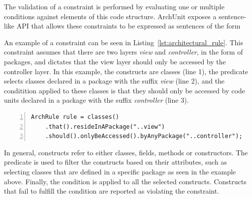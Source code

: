 The validation of a constraint is performed by evaluating one or multiple conditions against elements of this code structure. ArchUnit exposes a sentence-like API that allows these constraints to be expressed as sentences of the form  

An example of a constraint can be seen in Listing~\ref{lst:architectural_rule}. This constraint assumes that there are two layers \textit{view} and \textit{controller}, in the form of packages, and dictates that the view layer should only be accessed by the controller layer. In this example, the constructs are classes (line 1), the predicate selects classes declared in a package with the suffix \textit{view} (line 2), and the conditition applied to these classes is that they should only be accessed by code units declared in a package with the suffix \textit{controller} (line 3).

\begin{center}
\begin{minipage}{0.90\linewidth}
\begin{lstlisting}[caption={Example of an architectural rule in ArchUnit.}, captionpos=b, label=lst:architectural_rule, numbers=left]
ArchRule rule = classes()
    .that().resideInAPackage("..view")
    .should().onlyBeAccessed().byAnyPackage("..controller");
\end{lstlisting}
\end{minipage}
\end{center}

In general, constructs refer to either classes, fields, methods or constructors. The predicate is used to filter the constructs based on their attributes, such as selecting classes that are defined in a specific package as seen in the example above. Finally, the condition is applied to all the selected constructs. Constructs that fail to fulfill the condition are reported as violating the constraint.





